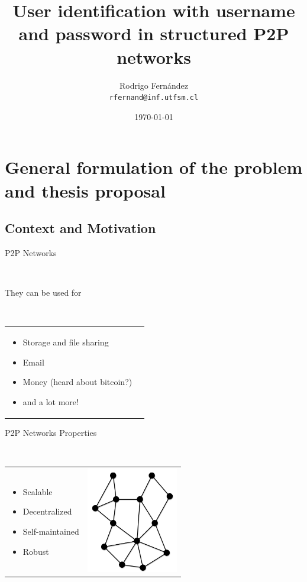 \documentclass[12pt]{beamer}
\title{User identification with username and password in structured P2P networks}
\subtitle{}
\author[R. Fernández]{Rodrigo Fernández \\ \small{\texttt{rfernand@inf.utfsm.cl}}}
\institute[]{Universidad Técnica Federico Santa María}
\date{\today}
\renewcommand{\frametitle}[1]{\vspace{0.2cm}\begin{huge}#1\end{huge}\\}
\renewcommand{\framesubtitle}[1]{\vspace{0.4cm} \hspace{0.4cm}\begin{large}#1\end{large}\\}
\begin{document}
  

  \frame{\titlepage}
  \frame{\tableofcontents}

  \section{General formulation of the problem and thesis proposal}
  \subsection{Context and Motivation}

  \begin{frame}
  \frametitle{P2P Networks}
  \framesubtitle{They can be used for}
  
  \begin{table}
  \begin{tabular}{p{7cm}p{3cm}}
  \begin{itemize}
    \item Storage and file sharing
    \item Email
    \item Money (heard about bitcoin?)
    \item and a lot more!
  \end{itemize}
  &
  \vspace{1.5cm}
  \end{tabular}
  \end{table}
  \end{frame}

    \begin{frame}
    \frametitle{P2P Networks Properties}
    \begin{table}
    \begin{tabular}{p{7cm}p{3cm}}
    \begin{itemize}
      \item Scalable
      \item Decentralized
      \item Self-maintained
      \item Robust
    \end{itemize}
    &
    \vspace{1.5cm}
    \includegraphics[width=4cm]{../../presentacion/img/p2p-unstructured}\\
    \end{tabular}
    \end{table}
    \end{frame}
    
\end{document}

